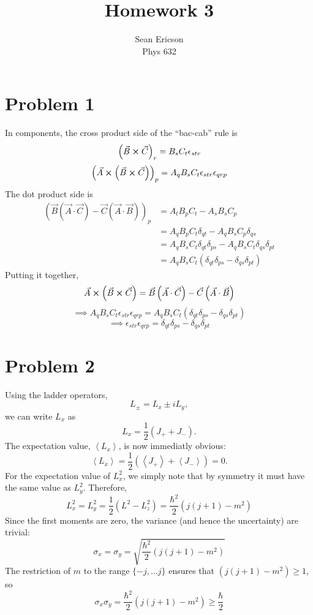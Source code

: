 \documentclass[12pt]{article}
\newcommand{\avg}[1]{\left<#1\right>}
\begin{document}
	
\title{Homework 3}
\author{Sean Ericson \\ Phys 632}
\maketitle

\section*{Problem 1}
In components, the cross product side of the ``bac-cab'' rule is
\[ \left(\vec{B}\cross\vec{C}\right)_r = B_sC_t\epsilon_{str} \]
\[ \left(\vec{A}\cross\left(\vec{B}\cross\vec{C}\right)\right)_p = A_qB_sC_t\epsilon_{str}\epsilon_{qrp} \]
The dot product side is
\begin{align*}
    \left(\vec{B}\left(\vec{A}\cdot\vec{C}\right)-\vec{C}\left(\vec{A}\cdot\vec{B}\right)\right)_p & = A_tB_pC_t - A_sB_sC_p \\
    & = A_qB_pC_t\delta_{qt} - A_qB_sC_p\delta_{qs} \\
    & = A_qB_sC_t\delta_{qt}\delta_{ps} - A_qB_sC_t\delta_{qs}\delta_{pt} \\
    & = A_qB_sC_t\left(\delta_{qt}\delta_{ps}-\delta_{qs}\delta_{pt}\right)
\end{align*}
Putting it together,
\[ \vec{A}\cross\left(\vec{B}\cross\vec{C}\right) = \vec{B}\left(\vec{A}\cdot\vec{C}\right)-\vec{C}\left(\vec{A}\cdot\vec{B}\right) \]
\[ \implies A_qB_sC_t\epsilon_{str}\epsilon_{qrp} = A_qB_sC_t\left(\delta_{qt}\delta_{ps}-\delta_{qs}\delta_{pt}\right) \]
\[ \implies \epsilon_{str}\epsilon_{qrp} = \delta_{qt}\delta_{ps}-\delta_{qs}\delta_{pt} \]


\section*{Problem 2}
Using the ladder operators,
\[ L_\pm = L_x \pm iL_y, \]
we can write $L_x$ as
\[ L_x = \frac{1}{2}\left(J_+ + J_-\right). \]
The expectation value, $\avg{L_x}$, is now immediatly obvious:
\[ \avg{L_x} = \frac{1}{2}\left(\avg{J_+} + \avg{J_-}\right) = 0. \]
For the expectation value of $L_x^2$, we simply note that by symmetry it must have the same value as $L_y^2$. Therefore,
\[ L_x^2 = L_y^2 = \frac{1}{2}\left(L^2 - L_z^2\right) = \frac{\hbar^2}{2}(j(j+1)-m^2) \]
Since the first moments are zero, the variance (and hence the uncertainty) are trivial:
\[ \sigma_x = \sigma_y = \sqrt{\frac{\hbar^2}{2}(j(j+1)-m^2)} \]
The restriction of $m$ to the range $\{-j,...j\}$ ensures that $(j(j+1)-m^2)\geq1$, so
\[ \sigma_x\sigma_y = \frac{\hbar^2}{2}(j(j+1)-m^2) \geq \frac{\hbar}{2} \]
\end{document}
